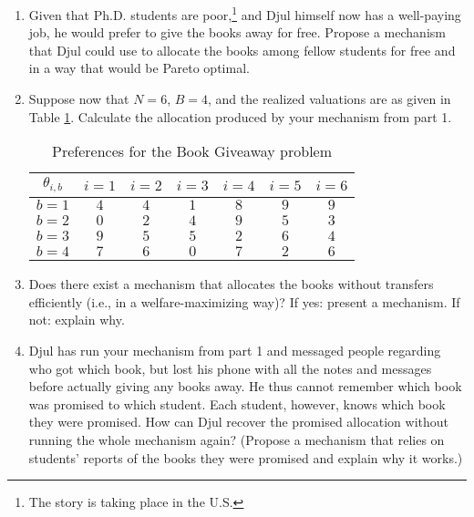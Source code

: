 \documentclass[a4paper]{article}
\begin{document}
\begin{enumerate}
	\item Given that Ph.D. students are poor,\footnote{The story is taking place in the U.S.} and Djul himself now has a well-paying job, he would prefer to give the books away for free. Propose a mechanism that Djul could use to allocate the books among fellow students for free and in a way that would be Pareto optimal. 
	
	\item Suppose now that $N=6$, $B=4$, and the realized valuations are as given in Table \ref{table:books}. Calculate the allocation produced by your mechanism from part 1.
	\begin{table}[h]
		\begin{center}
			\begin{tabular}{| c || c | c | c | c | c | c |}
				\hline
				$\theta_{i,b}$ & $i=1$ & $i=2$ & $i=3$ & $i=4$ & $i=5$ & $i=6$
				\\ \hline\hline
				$b=1$ & $4$ & $4$ & $1$ & $8$ & $9$ & $9$
				\\ \hline
				$b=2$ & $0$ & $2$ & $4$ & $9$ & $5$ & $3$
				\\ \hline
				$b=3$ & $9$ & $5$ & $5$ & $2$ & $6$ & $4$
				\\ \hline
				$b=4$ & $7$ & $6$ & $0$ & $7$ & $2$ & $6$
				\\ \hline
			\end{tabular}
			\caption{Preferences for the Book Giveaway problem}
			\label{table:books}
		\end{center}
	\end{table}
	
	\item Does there exist a mechanism that allocates the books without transfers efficiently (i.e., in a welfare-maximizing way)? If yes: present a mechanism. If not: explain why.
	
	\item Djul has run your mechanism from part 1 and messaged people regarding who got which book, but lost his phone with all the notes and messages before actually giving any books away. He thus cannot remember which book was promised to which student. Each student, however, knows which book they were promised. How can Djul recover the promised allocation without running the whole mechanism again? (Propose a mechanism that relies on students' reports of the books they were promised and explain why it works.)
\end{enumerate}
\end{document}
